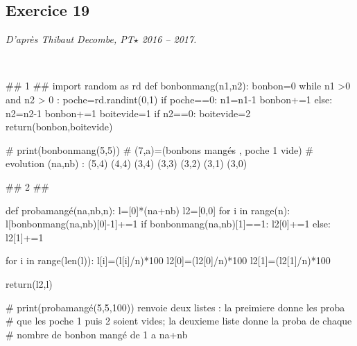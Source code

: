 \documentclass[10pt,fleqn]{article} %
\begin{document}
\subsection*{Exercice 19}
\textit{D'après Thibaut Decombe, PT$\star$ 2016 -- 2017.}
\begin{corrige}
$\quad$
\begin{python}
## 1 ##
import random as rd
def bonbonmang(n1,n2):
    bonbon=0
    while n1 >0 and n2 > 0 :
        poche=rd.randint(0,1)
        if poche==0:
            n1=n1-1
            bonbon+=1
        else:
            n2=n2-1
            bonbon+=1
    boitevide=1
    if n2==0:
        boitevide=2
    return(bonbon,boitevide)

# print(bonbonmang(5,5))
# (7,a)=(bonbons mangés , poche 1 vide)
# evolution (na,nb) : (5,4) (4,4) (3,4) (3,3) (3,2) (3,1) (3,0)

## 2 ##

def probamangé(na,nb,n):
    l=[0]*(na+nb)
    l2=[0,0]
    for i in range(n):
        l[bonbonmang(na,nb)[0]-1]+=1
        if bonbonmang(na,nb)[1]==1:
            l2[0]+=1
        else:
            l2[1]+=1
            
    for i in range(len(l)):
        l[i]=(l[i]/n)*100
    l2[0]=(l2[0]/n)*100
    l2[1]=(l2[1]/n)*100
    
    return(l2,l)

# print(probamangé(5,5,100)) renvoie deux listes : la preimiere donne les proba
# que les poche 1 puis 2 soient vides; la deuxieme liste donne la proba de chaque
# nombre de bonbon mangé de 1 a na+nb 
    
\end{python}
\end{corrige}
\end{document}
